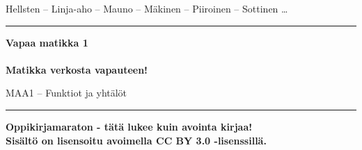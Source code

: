
\begin{center}
    \begin{doublespace}
        \begin{LARGE}
            \textrm{Hellsten -- Linja-aho -- Mauno -- Mäkinen -- Piiroinen -- Sottinen \ldots} \\
        \end{LARGE}
      
        \vspace{0.5cm}
        \hrule height 2pt
        \vspace{1cm}
        \begin{Huge}
            \textbf{\textrm{Vapaa matikka 1}\\\ \\Matikka verkosta vapauteen!}
        \end{Huge}
      
        \vfill
      
        \begin{huge}
            \textrm{MAA1 – Funktiot ja yhtälöt}
        \end{huge}
        \vspace{1cm}
        \hrule height 2pt
    \end{doublespace}
\end{center}

\vfill

\begin{flushright}
    \textbf{
        Oppikirjamaraton - tätä lukee kuin avointa kirjaa! \\
        Sisältö on lisensoitu avoimella CC BY 3.0 -lisenssillä. \\
    }
\end{flushright}